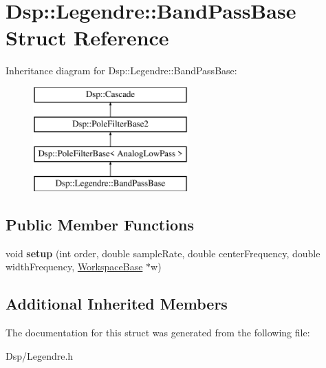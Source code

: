 \hypertarget{structDsp_1_1Legendre_1_1BandPassBase}{\section{Dsp\-:\-:Legendre\-:\-:Band\-Pass\-Base Struct Reference}
\label{structDsp_1_1Legendre_1_1BandPassBase}
}
Inheritance diagram for Dsp\-:\-:Legendre\-:\-:Band\-Pass\-Base\-:\begin{figure}[H]
\begin{center}
\leavevmode
\includegraphics[height=4.000000cm]{structDsp_1_1Legendre_1_1BandPassBase}
\end{center}
\end{figure}
\subsection*{Public Member Functions}
\begin{DoxyCompactItemize}
\item 
\hypertarget{structDsp_1_1Legendre_1_1BandPassBase_a188b0146287b4594363bf9a7aefbb123}{void {\bfseries setup} (int order, double sample\-Rate, double center\-Frequency, double width\-Frequency, \hyperlink{structDsp_1_1Legendre_1_1WorkspaceBase}{Workspace\-Base} $\ast$w)}\label{structDsp_1_1Legendre_1_1BandPassBase_a188b0146287b4594363bf9a7aefbb123}

\end{DoxyCompactItemize}
\subsection*{Additional Inherited Members}


The documentation for this struct was generated from the following file\-:\begin{DoxyCompactItemize}
\item 
Dsp/Legendre.\-h\end{DoxyCompactItemize}
